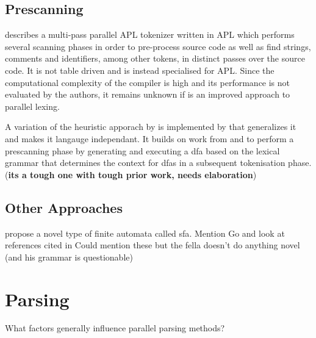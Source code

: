 \subsection{Prescanning} \label{lit_prescanning}

\cite{bernecky_spmdsimd_2003} describes a multi-pass parallel APL tokenizer
written in APL which performs several scanning phases in order to pre-process
source code as well as find strings, comments and identifiers, among other
tokens, in distinct passes over the source code. It is not table driven and is
instead specialised for APL. Since the computational complexity of the compiler
is high and its performance is not evaluated by the authors, it remains unknown
if is an improved approach to parallel lexing.

A variation of the heuristic apporach by \cite{barenghi_parallel_2015} is
implemented by \cite{li_plex_2021} that generalizes it and makes it langauge
independant. It builds on work from \cite{sinya_simultaneous_2013} and
\cite{zhao_--fly_2015} to perform a prescanning phase by generating and
executing a \gls{dfa} based on the lexical grammar that determines the context
for \glspl{dfa} in a subsequent tokenisation phase. (\textbf{its a tough one
with tough prior work, needs elaboration})


\subsection{Other Approaches} \label{other_approaches}

\begin{roughwork}
\cite{sinya_simultaneous_2013} propose a novel type of finite automata called
\gls{sfa}.
\newline \newline
Mention \cite{lin_accelerating_2013, wang_hyperscan_2019,
li_plex_2021, asthagiri_associative_1992} Go and look at references cited in
\cite{zhao_--fly_2015}
\newline \newline
Could mention these but the fella doesn't do anything novel (and his
grammar is questionable) \cite{barve_parallel_2014, barve_parallel_2012,
barve_improved_2015}
\end{roughwork}

\section{Parsing} \label{lit_review_parsing}
\begin{sectionplan}
    What factors generally influence parallel parsing methods?
\end{sectionplan}

